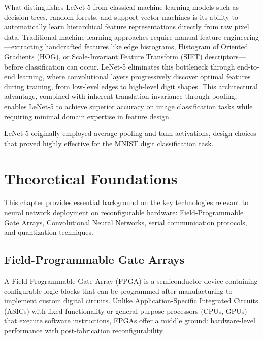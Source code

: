 \documentclass[12pt,a4paper]{report}
\begin{document}
What distinguishes LeNet-5 from classical machine learning models such as decision trees, random forests, and support vector machines is its ability to automatically learn hierarchical feature representations directly from raw pixel data. Traditional machine learning approaches require manual feature engineering—extracting handcrafted features like edge histograms, Histogram of Oriented Gradients (HOG), or Scale-Invariant Feature Transform (SIFT) descriptors—before classification can occur. LeNet-5 eliminates this bottleneck through end-to-end learning, where convolutional layers progressively discover optimal features during training, from low-level edges to high-level digit shapes. This architectural advantage, combined with inherent translation invariance through pooling, enables LeNet-5 to achieve superior accuracy on image classification tasks while requiring minimal domain expertise in feature design.

LeNet-5 originally employed average pooling and tanh activations, design choices that proved highly effective for the MNIST digit classification task. 

\chapter{Theoretical Foundations}

This chapter provides essential background on the key technologies relevant to neural network deployment on reconfigurable hardware: Field-Programmable Gate Arrays, Convolutional Neural Networks, serial communication protocols, and quantization techniques.

\section{Field-Programmable Gate Arrays}

A Field-Programmable Gate Array (FPGA) is a semiconductor device containing configurable logic blocks that can be programmed after manufacturing to implement custom digital circuits. Unlike Application-Specific Integrated Circuits (ASICs) with fixed functionality or general-purpose processors (CPUs, GPUs) that execute software instructions, FPGAs offer a middle ground: hardware-level performance with post-fabrication reconfigurability.
\end{document}
